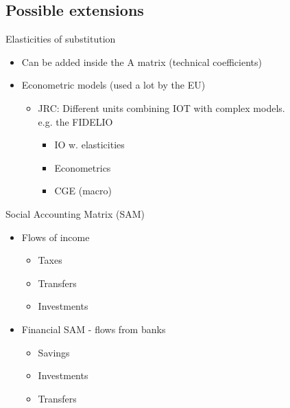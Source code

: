 \begin{multicols}{2}
\subsection{Possible extensions}
Elasticities of substitution
\begin{itemize}
  \item Can be added inside the A matrix (technical coefficients)
  \item Econometric models (used a lot by the EU)
  \begin{itemize}
    \item JRC: Different units combining IOT with complex models.\\
          e.g. the FIDELIO
    \begin{itemize}
      \item IO w. elasticities
      \item Econometrics
      \item CGE (macro)
    \end{itemize}
  \end{itemize}
\end{itemize}
Social Accounting Matrix (SAM)
\begin{itemize}
  \item Flows of income
  \begin{itemize}
    \item Taxes
    \item Transfers
    \item Investments
  \end{itemize}
  \item Financial SAM - flows from banks
  \begin{itemize}
    \item Savings
    \item Investments
    \item Transfers
  \end{itemize}
\end{itemize}


\end{multicols}




